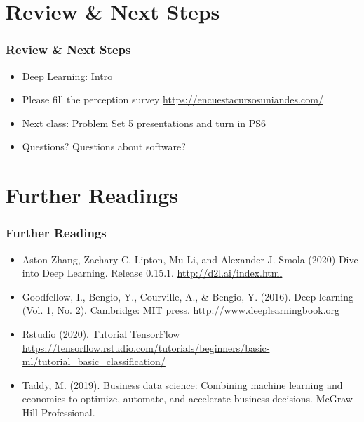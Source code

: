 \documentclass[
  shownotes,
  xcolor={svgnames},
  hyperref={colorlinks,citecolor=DarkBlue,linkcolor=DarkRed,urlcolor=DarkBlue}
  , aspectratio=169]{beamer}
\begin{document}
\section{Review
 \& Next Steps}
\begin{frame}
\frametitle{Review \& Next Steps}
  
\begin{itemize} 
  

\item  Deep Learning: Intro

\bigskip
\item Please fill the perception survey \url{https://encuestacursosuniandes.com/}
    \bigskip  
  \item  Next class:  Problem Set 5 presentations and turn in PS6


\bigskip  
\item Questions? Questions about software? 

\end{itemize}
\end{frame}


\section{Further Readings}
\begin{frame}
\frametitle{Further Readings}

\begin{itemize}
\footnotesize

  
  \item Aston Zhang, Zachary C. Lipton, Mu Li, and Alexander J. Smola (2020) Dive into Deep Learning. Release 0.15.1. \url{http://d2l.ai/index.html}
  \medskip
  \item Goodfellow, I., Bengio, Y., Courville, A., \& Bengio, Y. (2016). Deep learning (Vol. 1, No. 2). Cambridge: MIT press. \url{http://www.deeplearningbook.org}
  \medskip 

  \item Rstudio (2020). Tutorial TensorFlow \url{https://tensorflow.rstudio.com/tutorials/beginners/basic-ml/tutorial_basic_classification/}
  \medskip
  \item Taddy, M. (2019). Business data science: Combining machine learning and economics to optimize, automate, and accelerate business decisions. McGraw Hill Professional.


  
\end{itemize}

\end{frame}
\end{document}
